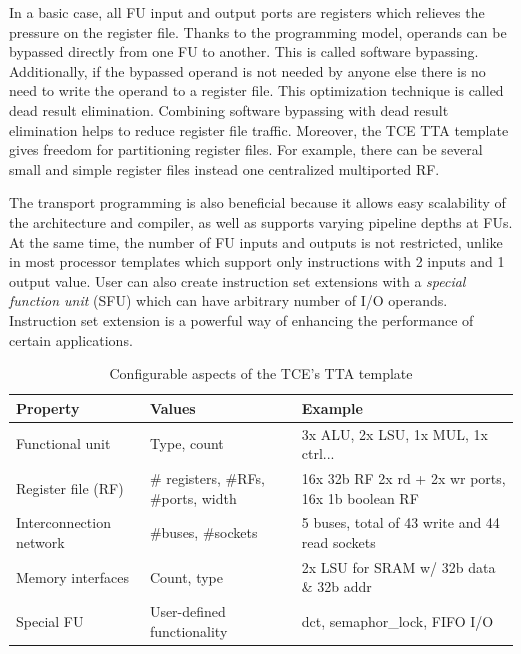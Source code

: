 \documentclass[a4paper,twoside]{tceusermanual}
\begin{document}
In a basic case, all FU input and output ports are registers which
relieves the pressure on the register file. Thanks to the programming
model, operands can be bypassed directly from one FU to another. This
is called software bypassing. Additionally, if the bypassed operand is
not needed by anyone else there is no need to write the operand to a
register file. This optimization technique is called dead result
elimination. Combining software bypassing with dead result elimination
helps to reduce register file traffic.  Moreover, the TCE TTA template
gives freedom for partitioning register files. For example, there can
be several small and simple register files instead one centralized
multiported RF.

The transport programming is also beneficial because it allows easy
scalability of the architecture and compiler, as well as supports
varying pipeline depths at FUs. At the same time, the number of FU
inputs and outputs is not restricted, unlike in most processor
templates which support only instructions with 2 inputs and 1
output value. User can also create instruction set extensions with a
\textit{special function unit} (SFU) which can have arbitrary number
of I/O operands. Instruction set extension is a powerful way of
enhancing the performance of certain applications.

\begin{table}
  \begin{center}
    \caption {Configurable aspects of the TCE's TTA template}
    \label {tab:filetypes}
    \begin{tabular}{l | l | l }
      \hline
      Property & Values & Example  \\
      \hline
      \hline
      Functional unit         & Type, count                         & 3x ALU, 2x LSU, 1x MUL, 1x ctrl...\\
      Register file (RF)      & \# registers, \#RFs, \#ports, width & 16x 32b RF 2x rd + 2x wr ports, 16x 1b boolean RF \\
      Interconnection network & \#buses, \#sockets                & 5 buses, total of 43 write and 44 read sockets\\
      Memory interfaces       & Count, type                       & 2x LSU for SRAM w/ 32b data \& 32b addr \\
      Special FU              & User-defined functionality        & dct, semaphor\_lock, FIFO I/O \\
      \hline
    \end{tabular}
  \end{center}
\end{table}
\end{document}
